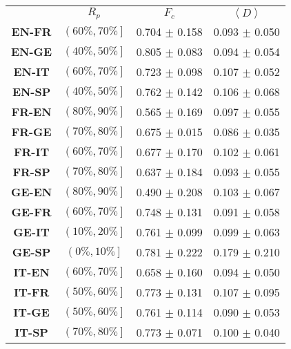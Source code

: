 

\begin{table}[t]
	\centering
	\begin{tabular}{cccc}
	          & \textbf{$R_{p}$} & \textbf{$F_{c}$} & \textbf{$\left\langle D \right\rangle$} \\[2pt]
		\textbf{EN-FR} & $\left( 60\%, 70\% \right]$  & 0.704 $\pm$ 0.158 &  0.093 $\pm$ 0.050 \\
		\textbf{EN-GE} & $\left( 40\%, 50\% \right]$ & 0.805 $\pm$ 0.083 &  0.094 $\pm$ 0.054 \\
		\textbf{EN-IT} & $\left( 60\%, 70\% \right]$ & 0.723 $\pm$ 0.098 &  0.107 $\pm$ 0.052 \\ 
		\textbf{EN-SP} & $\left( 40\%, 50\% \right]$ & 0.762 $\pm$ 0.142 &  0.106 $\pm$ 0.068 \\[4pt]
		
		\textbf{FR-EN} & $\left( 80\%, 90\% \right]$ & 0.565 $\pm$ 0.169 &  0.097 $\pm$ 0.055 \\
	    \textbf{FR-GE} & $\left( 70\%, 80\% \right]$ & 0.675 $\pm$ 0.015 &  0.086 $\pm$ 0.035 \\
		\textbf{FR-IT} & $\left( 60\%, 70\% \right]$ & 0.677 $\pm$ 0.170 &  0.102 $\pm$ 0.061 \\ 
		\textbf{FR-SP} & $\left( 70\%, 80\% \right]$ & 0.637 $\pm$ 0.184 &  0.093 $\pm$ 0.055 \\[4pt]
		
		\textbf{GE-EN} & $\left( 80\%, 90\% \right]$ & 0.490 $\pm$ 0.208 &  0.103 $\pm$ 0.067 \\
		\textbf{GE-FR} & $\left( 60\%, 70\% \right]$ & 0.748 $\pm$ 0.131 &  0.091 $\pm$ 0.058 \\
		\textbf{GE-IT} & $\left( 10\%, 20\% \right]$ & 0.761 $\pm$ 0.099 &  0.099 $\pm$ 0.063 \\
		\rowcolor{malo}\textbf{GE-SP} & $\left( 0\%, 10\% \right]$ & 0.781 $\pm$ 0.222 &  0.179 $\pm$ 0.210 \\
		[4pt]
		
		\textbf{IT-EN} & $\left( 60\%, 70\% \right]$ & 0.658 $\pm$ 0.160 &  0.094 $\pm$ 0.050 \\
		\textbf{IT-FR} & $\left( 50\%, 60\% \right]$ & 0.773 $\pm$ 0.131 &  0.107 $\pm$ 0.095 \\
		\textbf{IT-GE} & $\left( 50\%, 60\% \right]$ & 0.761 $\pm$ 0.114 &  0.090 $\pm$ 0.053  \\
		\rowcolor{bueno}\textbf{IT-SP} & $\left( 70\%, 80\% \right]$ & 0.773 $\pm$ 0.071 &  0.100 $\pm$ 0.040 \\[4pt]
		

\end{tabular}
\end{table}
